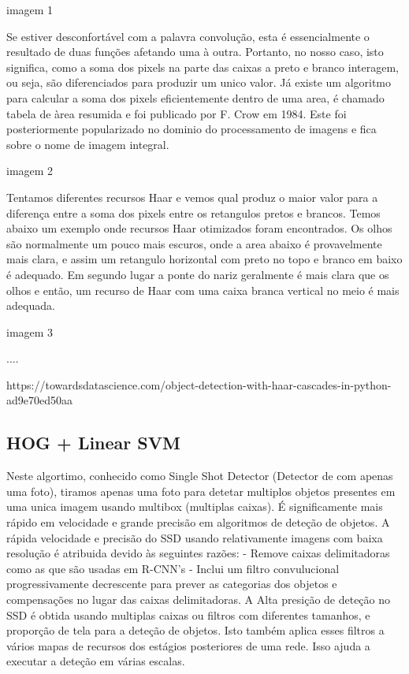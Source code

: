 imagem 1


Se estiver desconfortável com a palavra convolução, esta é essencialmente o resultado de duas funções afetando uma à outra. Portanto, no nosso caso, isto significa, como a soma dos pixels na parte das caixas a preto e branco interagem, ou seja, são diferenciados para produzir um unico valor. Já existe um algoritmo para calcular a soma dos pixels eficientemente dentro de uma area, é chamado tabela de àrea resumida e foi publicado por F. Crow em 1984. Este foi posteriormente popularizado no dominio do processamento de imagens e fica sobre o nome de imagem integral.


imagem 2

Tentamos diferentes recursos Haar e vemos qual produz o maior valor para a diferença entre a soma dos pixels entre os retangulos pretos e brancos. Temos abaixo um exemplo onde recursos Haar otimizados foram encontrados. Os olhos são normalmente um pouco mais escuros, onde a area abaixo é provavelmente mais clara, e assim um retangulo horizontal com preto no topo e branco em baixo é adequado. Em segundo lugar a ponte do nariz geralmente é mais clara que os olhos e então, um recurso de Haar com uma caixa branca vertical no meio é mais adequada.


imagem 3

....


https://towardsdatascience.com/object-detection-with-haar-cascades-in-python-ad9e70ed50aa



\subsection{HOG + Linear SVM}
Neste algortimo, conhecido como Single Shot Detector (Detector de com apenas uma foto), tiramos apenas uma foto para detetar multiplos objetos presentes em uma unica imagem usando multibox (multiplas caixas).
É significamente mais rápido em velocidade e grande precisão em algoritmos de deteção de objetos.
\newline
A rápida velocidade e precisão do SSD usando relativamente imagens com baixa resolução é atribuida devido às seguintes razões:
\newline - Remove caixas delimitadoras como as que são usadas em R-CNN's
\newline - Inclui um filtro convulucional progressivamente decrescente para prever as categorias dos objetos e compensações no lugar das caixas delimitadoras.
\newline
A Alta presição de deteção no SSD é obtida usando multiplas caixas ou filtros com diferentes tamanhos, e proporção de tela para a deteção de objetos. Isto também aplica esses filtros a vários mapas de recursos dos estágios posteriores de uma rede. Isso ajuda a executar a deteção em várias escalas.

